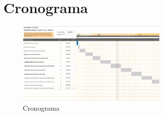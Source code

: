 \documentclass[twoside,twocolumn]{article}
\begin{document}
\section{Cronograma}
\begin{figure}[htb]
	\begin{center}
		\includegraphics[width=7.5cm]{./Imagenes/Cronograma} 
		\caption{Cronograma}
	\end{center}
\end{figure}
\end{document}
